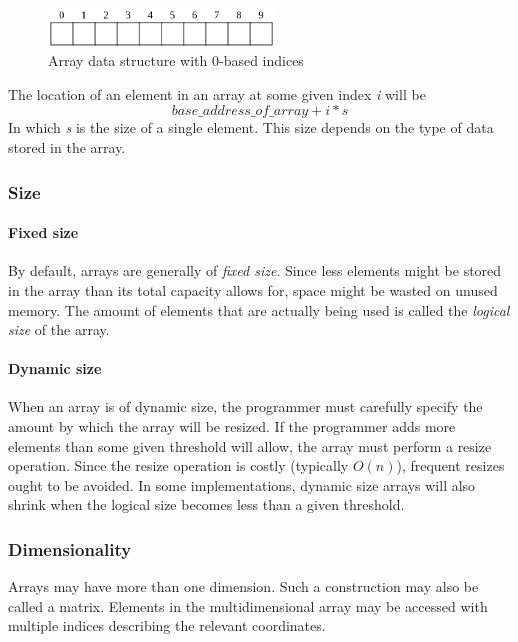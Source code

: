 \documentclass{article}
\begin{document}
\begin{figure}[H]
  \centering
  \includegraphics[width=6cm]{array}
  \caption{Array data structure with 0-based indices}
\end{figure}

The location of an element in an array at some given index {\em i} will be
\[base\_address\_of\_array + i * s\]
In which {\em s} is the size of a single element. This size depends on the type of data stored in the array.

\subsubsection{Size}
\paragraph{Fixed size}
By default, arrays are generally of {\em fixed size}. Since less elements might be stored in the array than its total
capacity allows for, space might be wasted on unused memory. The amount of elements that are actually being used is
called the {\em logical size} of the array.

\paragraph{Dynamic size}
When an array is of dynamic size, the programmer must carefully specify the amount by which the array will be resized.
If the programmer adds more elements than some given threshold will allow, the array must perform a resize operation.
Since the resize operation is costly (typically \(O(n)\)), frequent resizes ought to be avoided. In some implementations,
dynamic size arrays will also shrink when the logical size becomes less than a given threshold.

\subsubsection{Dimensionality}
Arrays may have more than one dimension. Such a construction may also be called a matrix.
Elements in the multidimensional array may be accessed with multiple indices describing the relevant coordinates.


\newpage
\end{document}
